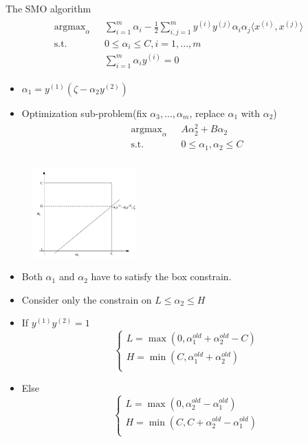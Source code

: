 \documentclass{beamer}
\begin{document}
\begin{frame}{The SMO algorithm}
\begin{align}
\begin{split}
\text{argmax}_{\alpha}\text{   }&\sum_{i=1}^m\alpha_i - \frac{1}{2}\sum_{i,j=1}^my^{(i)}y^{(j)}\alpha_i\alpha_j\langle x^{(i)}, x^{(j)}\rangle \\
\text{s.t.} \text{   }&0\leq \alpha_i \leq C, i=1,...,m\\
&\sum_{i=1}^m\alpha_iy^{(i)}=0
\end{split}
\end{align}
\begin{itemize}
\item $\alpha_1 = y^{(1)}(\zeta - \alpha_2y^{(2)})$
\item Optimization sub-problem(fix $\alpha_3,...,\alpha_m$, replace $\alpha_1$ with $\alpha_2$)
\begin{align}
\begin{split}
\text{argmax}_{\alpha}\text{   }& A\alpha_2^2 + B\alpha_2 \\
\text{s.t.} \text{   }&0\leq \alpha_1, \alpha_2 \leq C\\
\end{split}
\end{align}
\end{itemize}
\end{frame}

\begin{frame}
\begin{figure}
\includegraphics[width=4cm]{images/img14.png}
\end{figure}
\begin{itemize}
\item Both $\alpha_1$ and $\alpha_2$ have to satisfy the box constrain.
\item Consider only the constrain on $L\leq \alpha_2 \leq H$
\item If $y^{(1)}y^{(2)} = 1$
\begin{equation}
\begin{cases}
L = \max(0, \alpha_1^{old}+\alpha_2^{old}-C)\\
H = \min(C, \alpha_1^{old}+\alpha_2^{old})\\
\end{cases}
\end{equation}
\item Else
\begin{equation}
\begin{cases}
L = \max(0, \alpha_2^{old}-\alpha_1^{old})\\
H = \min(C, C+\alpha_2^{old}-\alpha_1^{old})\\
\end{cases}
\end{equation}
\end{itemize}
\end{frame}
\end{document}
